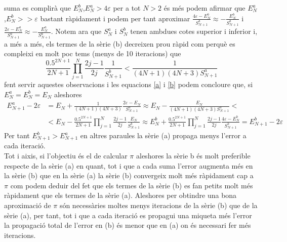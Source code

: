 \documentclass[a4paper,10pt]{article}
\renewcommand{\*}{\cdot}
\renewcommand{\epsilon}{\varepsilon}
\begin{document}
suma es complirà que $E_N^b$,$E_N^a>4\epsilon$ per a tot $N>2$ és més podem afirmar que $E_N^a$,$E_N^b>>\epsilon$ bastant ràpidament i podem per tant aproximar 
$\frac{4\epsilon-E_N^b}{S^b_{N+1}}\approx-\frac{E_N^b}{S^b_{N+1}}$ i $\frac{2\epsilon-E_N^a}{S^a_{N+1}}\approx-\frac{E_N^a}{S^a_{N+1}}$. Notem ara que $S_N^a$ i $S_N^b$
tenen ambdues cotes superior i inferior i, a més a més, els termes de la sèrie (b) decreixen prou ràpid com perquè es compleixi en molt poc tems (menys de 10 iteracions) que
\begin{equation*}
 \frac{0.5^{2N+1}}{2N+1}\prod_{j=1}^N\frac{2j-1}{2j}\frac{1}{S^b_{N+1}}<\frac{1}{(4N+1)(4N+3)S^a_{N+1}}
\end{equation*}
fent servir aquestes observacions i les equacions \ref{a} i \ref{b} podem concloure que, si $E_N^a=E_N^b=E_N$ aleshores
\begin{equation*}
\begin{split}
 E_{N+1}^a-2\epsilon&=E_N+\frac{1}{(4N+1)(4N+3)}\frac{2\epsilon-E_N}{S^a_{N+1}}\approx E_N-\frac{E_N}{(4N+1)(4N+3)S^a_{N+1}}<\\
 &<E_N-\frac{0.5^{2N+1}}{2N+1}
 \prod_{j=1}^N\frac{2j-1}{2j}\frac{E_N}{S^b_{N+1}}\approx E_N^b+\frac{0.5^{2N+1}}{2N+1}
 \prod_{j=1}^N\frac{2j-1}{2j}\frac{4\epsilon-E_N^b}{S^b_{N+1}}=E_{N+1}^b-2\epsilon
\end{split}
 \end{equation*}
 Per tant $E_{N+1}^b>E_{N+1}^a$ en altres paraules la sèrie (a) propaga menys l'error a cada iteració.\\ Tot i aixis, si l'objectiu és el de calcular $\pi$ aleshores la sèrie
 b és molt preferible respecte de la sèrie (a) en quant, tot i que a cada suma l'error augmenta més en la sèrie (b) que en la sèrie (a) la sèrie (b) convergeix molt més
 ràpidament cap a $\pi$ com podem deduir del fet que els termes de la sèrie (b) es fan petits molt més ràpidament que els termes de la sèrie (a).
 Aleshores per obtindre una bona aproximació de $\pi$ són necessàries moltes menys iteracions de la sèrie (b) que de la sèrie (a), per tant, tot i que a cada iteració es
 propagui una miqueta més l'error la propagació total de l'error en (b) és menor que en (a) on és necessari fer més iteracions.
\end{document}
